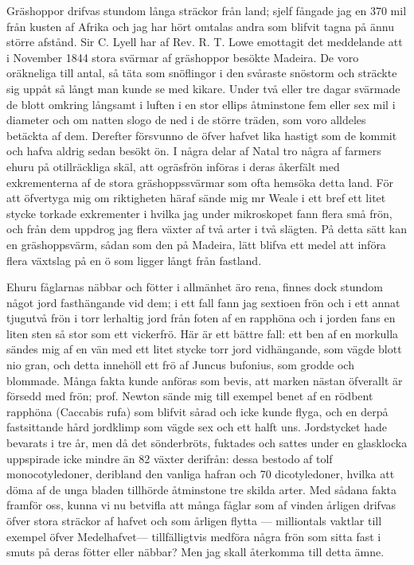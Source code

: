 Gräshoppor drifvas stundom långa sträckor från land; sjelf fångade jag en 370 mil från kusten af Afrika och jag har hört omtalas andra som blifvit tagna på ännu större afstånd. Sir C. Lyell har af Rev. R. T. Lowe emottagit det meddelande att i November 1844 stora svärmar af gräshoppor besökte Madeira. De voro oräkneliga till antal, så täta som snöflingor i den svåraste snöstorm och sträckte sig uppåt så långt man kunde se med kikare. Under två eller tre dagar svärmade de blott omkring långsamt i luften i en stor ellips åtminstone fem eller sex mil i diameter och om natten slogo de ned i de större träden, som voro alldeles betäckta af dem. Derefter försvunno de öfver hafvet lika hastigt som de kommit och hafva aldrig sedan besökt ön. I några delar af Natal tro några af farmers ehuru på otillräckliga skäl, att ogräsfrön införas i deras åkerfält med exkrementerna af de stora gräshoppssvärmar som ofta hemsöka detta land. För att öfvertyga mig om riktigheten häraf sände mig mr Weale i ett bref ett litet stycke torkade exkrementer i hvilka jag under mikroskopet fann flera små frön, och från dem uppdrog jag flera växter af två arter i två slägten. På detta sätt kan en gräshoppsvärm, sådan som den på Madeira, lätt blifva ett medel att införa flera växtslag på en ö som ligger långt från fastland.

Ehuru fåglarnas näbbar och fötter i allmänhet äro rena, finnes dock stundom något jord fasthängande vid dem; i ett fall fann jag sextioen frön och i ett annat tjugutvå frön i torr lerhaltig jord från foten af en rapphöna och i jorden fans en liten sten så stor som ett vickerfrö. Här är ett bättre fall: ett ben af en morkulla sändes mig af en vän med ett litet stycke torr jord vidhängande, som vägde blott nio gran, och detta innehöll ett frö af Juncus bufonius, som grodde och blommade. Många fakta kunde anföras som bevis, att marken nästan öfverallt är försedd med frön; prof. Newton sände mig till exempel benet af en rödbent rapphöna (Caccabis rufa) som blifvit sårad och icke kunde flyga, och en derpå fastsittande hård jordklimp som vägde sex och ett halft uns. Jordstycket hade bevarats i tre år, men då det sönderbröts, fuktades och sattes under en glasklocka uppspirade icke mindre än 82 växter derifrån: dessa bestodo af tolf monocotyledoner, deribland den vanliga hafran och 70 dicotyledoner, hvilka att döma af de unga bladen tillhörde åtminstone tre skilda arter. Med sådana fakta framför oss, kunna vi nu betvifla att många fåglar som af vinden årligen drifvas öfver stora sträckor af hafvet och som årligen flytta — milliontals vaktlar till exempel öfver Medelhafvet— tillfälligtvis medföra några frön som sitta fast i smuts på deras fötter eller näbbar? Men jag skall återkomma till detta ämne.

